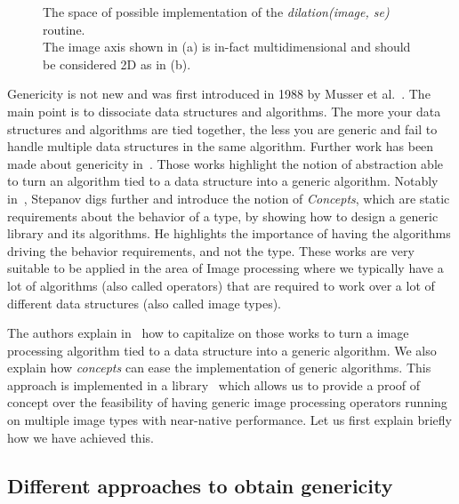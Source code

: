 \begin{figure}[htbp]
  \centering
  \subfloat[]{}
  \hfil
  \subfloat[]{}
  \caption{The space of possible implementation of the \emph{dilation(image, se)} routine.\\
    The image axis shown in (a) is in-fact multidimensional and should be considered 2D as in (b).}
  \label{fig:gen.espaceSAV}
\end{figure}

Genericity is not new and was first introduced in 1988 by Musser et al.~\parencite{musser.1988.generic}. The main point
is to dissociate data structures and algorithms. The more your data structures and algorithms are tied together, the
less you are generic and fail to handle multiple data structures in the same algorithm. Further work has been
made about genericity in~\parencite{musser.1994.algorithm,dehnert.1998.fundamentals}. Those works highlight the notion
of abstraction able to turn an algorithm tied to a data structure into a generic algorithm. Notably
in~\parencite{stepanov.2009.elements}, Stepanov digs further and introduce the notion of \emph{Concepts}, which are
static requirements about the behavior of a type, by showing how to design a generic library and its algorithms. He
highlights the importance of having the algorithms driving the behavior requirements, and not the type. These works
are very suitable to be applied in the area of Image processing where we typically have a lot of algorithms (also called
operators) that are required to work over a lot of different data structures (also called image types).

The authors explain in~\parencite{roynard.2019.rrpr} how to capitalize on those works to turn a image processing
algorithm tied to a data structure into a generic algorithm. We also explain how \emph{concepts} can ease the
implementation of generic algorithms. This approach is implemented in a library~\parencite{carlinet.2018.pylene} which
allows us to provide a proof of concept over the feasibility of having generic image processing operators running on
multiple image types with near-native performance. Let us first explain briefly how we have achieved this.

\subsection{Different approaches to obtain genericity}
\label{subsec:different.approaches}

